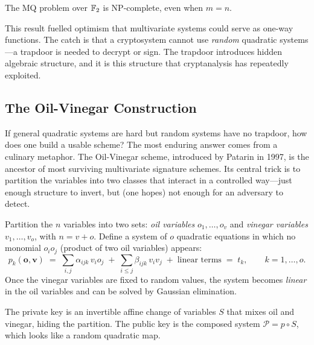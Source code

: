 \begin{theorem}[NP-Completeness]
\label{thm:mq-np}
The MQ problem over $\mathbb{F}_2$ is NP-complete, even when $m = n$.
\end{theorem}

This result fuelled optimism that multivariate systems could serve as one-way functions.  The catch is that a cryptosystem cannot use \emph{random} quadratic systems---a trapdoor is needed to decrypt or sign.  The trapdoor introduces hidden algebraic structure, and it is this structure that cryptanalysis has repeatedly exploited.


\subsection{The Oil-Vinegar Construction}
\label{subsec:oil-vinegar}

If general quadratic systems are hard but random systems have no trapdoor, how does one build a usable scheme?  The most enduring answer comes from a culinary metaphor.  The Oil-Vinegar scheme, introduced by Patarin in 1997, is the ancestor of most surviving multivariate signature schemes.  Its central trick is to partition the variables into two classes that interact in a controlled way---just enough structure to invert, but (one hopes) not enough for an adversary to detect.

\begin{definition}
\label{def:oil-vinegar}
Partition the $n$ variables into two sets: \emph{oil variables} $o_1,\ldots,o_v$ and \emph{vinegar variables} $v_1,\ldots,v_o$, with $n = v + o$.  Define a system of $o$ quadratic equations in which no monomial $o_i o_j$ (product of two oil variables) appears:
\begin{equation}
\label{eq:ov-map}
p_k(\mathbf{o}, \mathbf{v}) \;=\; \sum_{i,j} \alpha_{ijk}\, v_i o_j \;+\; \sum_{i \leq j} \beta_{ijk}\, v_i v_j \;+\; \text{linear terms} \;=\; t_k, \qquad k=1,\ldots,o.
\end{equation}
Once the vinegar variables are fixed to random values, the system becomes \emph{linear} in the oil variables and can be solved by Gaussian elimination.
\end{definition}

The private key is an invertible affine change of variables $S$ that mixes oil and vinegar, hiding the partition.  The public key is the composed system $\mathcal{P} = p \circ S$, which looks like a random quadratic map.

